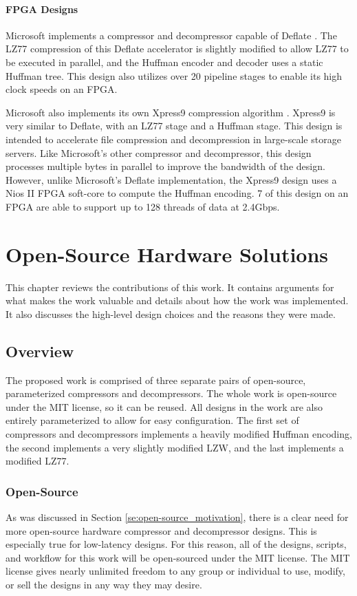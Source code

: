 \documentclass[doublespace,nopageskip]{VTthesis}
\begin{document}
\subsubsection{FPGA Designs}\label{sss:fpga_designs}

Microsoft implements a compressor and decompressor capable of Deflate \cite{microsoft}. The LZ77 compression of this Deflate accelerator is slightly modified to allow LZ77 to be executed in parallel, and the Huffman encoder and decoder uses a static Huffman tree. This design also utilizes over 20 pipeline stages to enable its high clock speeds on an FPGA.

Microsoft also implements its own Xpress9 compression algorithm \cite{xpress9}. Xpress9 is very similar to Deflate, with an LZ77 stage and a Huffman stage. This design is intended to accelerate file compression and decompression in large-scale storage servers. Like Microsoft's other compressor and decompressor, this design processes multiple bytes in parallel to improve the bandwidth of the design. However, unlike Microsoft's Deflate implementation, the Xpress9 design uses a Nios II FPGA soft-core to compute the Huffman encoding. 7 of this design on an FPGA are able to support up to 128 threads of data at 2.4Gbps.

\chapter{Open-Source Hardware Solutions} \label{ch:open-source_hardware_solutions}
This chapter reviews the contributions of this work. It contains arguments for what makes the work valuable and details about how the work was implemented. It also discusses the high-level design choices and the reasons they were made.

\section{Overview}\label{se:overview}
The proposed work is comprised of three separate pairs of open-source, parameterized compressors and decompressors. The whole work is open-source under the MIT license, so it can be reused. All designs in the work are also entirely parameterized to allow for easy configuration. The first set of compressors and decompressors implements a heavily modified Huffman encoding, the second implements a very slightly modified LZW, and the last implements a modified LZ77.

\subsection{Open-Source}\label{ss:open-source}
As was discussed in Section \ref{se:open-source_motivation}, there is a clear need for more open-source hardware compressor and decompressor designs. This is especially true for low-latency designs. For this reason, all of the designs, scripts, and workflow for this work will be open-sourced under the MIT license. The MIT license gives nearly unlimited freedom to any group or individual to use, modify, or sell the designs in any way they may desire.
\end{document}
